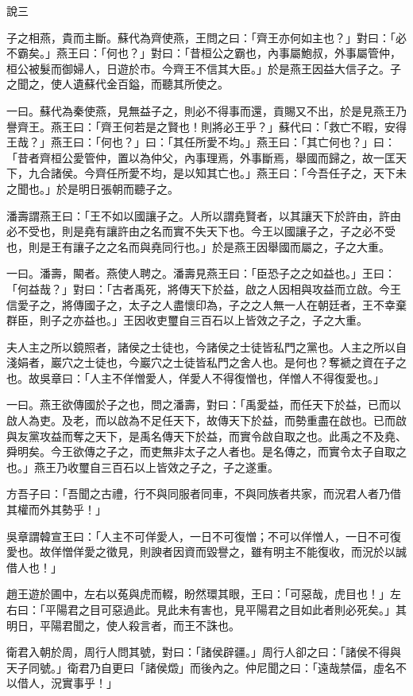 \begin{pinyinscope}
說三

子之相燕，貴而主斷。蘇代為齊使燕，王問之曰：「齊王亦何如主也？」對曰：「必不霸矣。」燕王曰：「何也？」對曰：「昔桓公之霸也，內事屬鮑叔，外事屬管仲，桓公被髮而御婦人，日遊於市。今齊王不信其大臣。」於是燕王因益大信子之。子之聞之，使人遺蘇代金百鎰，而聽其所使之。

一曰。蘇代為秦使燕，見無益子之，則必不得事而還，貢賜又不出，於是見燕王乃譽齊王。燕王曰：「齊王何若是之賢也！則將必王乎？」蘇代曰：「救亡不暇，安得王哉？」燕王曰：「何也？」曰：「其任所愛不均。」燕王曰：「其亡何也？」曰：「昔者齊桓公愛管仲，置以為仲父，內事理焉，外事斷焉，舉國而歸之，故一匡天下，九合諸侯。今齊任所愛不均，是以知其亡也。」燕王曰：「今吾任子之，天下未之聞也。」於是明日張朝而聽子之。

潘壽謂燕王曰：「王不如以國讓子之。人所以謂堯賢者，以其讓天下於許由，許由必不受也，則是堯有讓許由之名而實不失天下也。今王以國讓子之，子之必不受也，則是王有讓子之之名而與堯同行也。」於是燕王因舉國而屬之，子之大重。

一曰。潘壽，闞者。燕使人聘之。潘壽見燕王曰：「臣恐子之之如益也。」王曰：「何益哉？」對曰：「古者禹死，將傳天下於益，啟之人因相與攻益而立啟。今王信愛子之，將傳國子之，太子之人盡懷印為，子之之人無一人在朝廷者，王不幸棄群臣，則子之亦益也。」王因收吏璽自三百石以上皆效之子之，子之大重。

夫人主之所以鏡照者，諸侯之士徒也，今諸侯之士徒皆私門之黨也。人主之所以自淺娟者，巖穴之士徒也，今巖穴之士徒皆私門之舍人也。是何也？奪褫之資在子之也。故吳章曰：「人主不佯憎愛人，佯愛人不得復憎也，佯憎人不得復愛也。」

一曰。燕王欲傳國於子之也，問之潘壽，對曰：「禹愛益，而任天下於益，已而以啟人為吏。及老，而以啟為不足任天下，故傳天下於益，而勢重盡在啟也。已而啟與友黨攻益而奪之天下，是禹名傳天下於益，而實令啟自取之也。此禹之不及堯、舜明矣。今王欲傳之子之，而吏無非太子之人者也。是名傳之，而實令太子自取之也。」燕王乃收璽自三百石以上皆效之子之，子之遂重。

方吾子曰：「吾聞之古禮，行不與同服者同車，不與同族者共家，而況君人者乃借其權而外其勢乎！」

吳章謂韓宣王曰：「人主不可佯愛人，一日不可復憎；不可以佯憎人，一日不可復愛也。故佯憎佯愛之徵見，則諛者因資而毀譽之，雖有明主不能復收，而況於以誠借人也！」

趙王遊於圃中，左右以菟與虎而輟，盼然環其眼，王曰：「可惡哉，虎目也！」左右曰：「平陽君之目可惡過此。見此未有害也，見平陽君之目如此者則必死矣。」其明日，平陽君聞之，使人殺言者，而王不誅也。

衛君入朝於周，周行人問其號，對曰：「諸侯辟疆。」周行人卻之曰：「諸侯不得與天子同號。」衛君乃自更曰「諸侯燬」而後內之。仲尼聞之曰：「遠哉禁偪，虛名不以借人，況實事乎！」


\end{pinyinscope}
